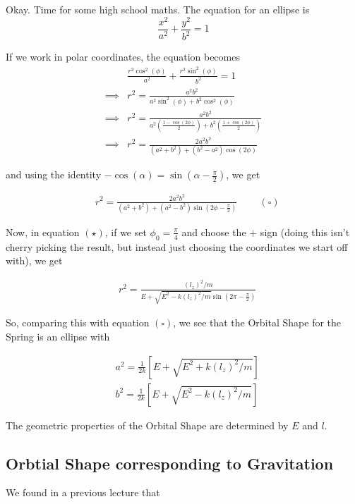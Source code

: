 \documentclass[11pt]{article}
\begin{document}
Okay. Time for some high school maths. The equation for an ellipse is 
\[ \frac{x^2}{a^2} + \frac{y^2}{b^2} = 1 \]

If we work in polar coordinates, the equation becomes
\begin{align*}
  &\frac{r^2 \cos^2(\phi)}{a^2} + \frac{r^2 \sin^2(\phi)}{b^2} = 1  \\
  \implies& r^2 = \frac{a^2 b^2}{a^2 \sin^2(\phi) + b^2 \cos^2(\phi)} \\
  \implies& r^2 = \frac{a^2 b^2}{ a^2 \left(\frac{1-\cos(2\phi)}{2}\right) + b^2 \left(\frac{1+\cos(2\phi)}{2}\right)} \\
  \implies& r^2 = \frac{2a^2 b^2}{(a^2 + b^2) + (b^2-a^2) \cos(2\phi) }
\end{align*}

and using the identity $-\cos(\alpha) = \sin(\alpha - \frac{\pi}{2})$, we get 

\begin{align*}
  &\boxed{r^2 = \frac{2a^2 b^2}{(a^2 + b^2) + (a^2 - b^2) \sin(2\phi - \frac{\pi}{2}) }} \;\;\;\;\;\;\;\; (\square)
\end{align*}

\vsize 0.25cm
Now, in equation $(\star)$, if we set $\phi_0 = \frac{\pi}{4}$ and choose the $+$ sign (doing this isn't cherry picking the result, but instead just choosing the coordinates we start off with), we get 

\begin{align*}
  &r^2 = \frac{(l_z)^2/m}{E + \sqrt{E^2 - k(l_z)^2/m} \sin(2\pi - \frac{\pi}{2}) }
\end{align*}

So, comparing this with equation $(\square)$, we see that the Orbital Shape for the Spring is an ellipse with 

\begin{align*}
  &a^2 = \frac{1}{2k} \left[ E + \sqrt{E^2 + k(l_z)^2/m} \right] \\
  &b^2 = \frac{1}{2k} \left[ E + \sqrt{E^2 - k(l_z)^2/m} \right] 
\end{align*}

The geometric properties of the Orbital Shape are determined by $E$ and $l$.

\vskip 1cm
\subsection{Orbtial Shape corresponding to Gravitation}

We found in a previous lecture that 
\end{document}
